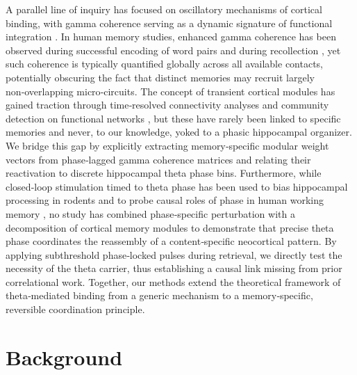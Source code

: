 \documentclass{article}
\begin{document}
A parallel line of inquiry has focused on oscillatory mechanisms of cortical binding, with gamma coherence serving as a dynamic signature of functional integration \cite{Singer1999Binding, Fries2005Gamma}. 
In human memory studies, enhanced gamma coherence has been observed during successful encoding of word pairs \cite{Sederberg2007Gamma} and during recollection \cite{Griffiths2019Directed}, yet such coherence is typically quantified globally across all available contacts, potentially obscuring the fact that distinct memories may recruit largely non‑overlapping micro‑circuits. 
The concept of transient cortical modules has gained traction through time‑resolved connectivity analyses \cite{Hsieh2017Dynamic} and community detection on functional networks \cite{Sporns2016Modular}, but these have rarely been linked to specific memories and never, to our knowledge, yoked to a phasic hippocampal organizer. 
We bridge this gap by explicitly extracting memory‑specific modular weight vectors from phase‑lagged gamma coherence matrices and relating their reactivation to discrete hippocampal theta phase bins. 
Furthermore, while closed‑loop stimulation timed to theta phase has been used to bias hippocampal processing in rodents \cite{Siegle2011Enhancement} and to probe causal roles of phase in human working memory \cite{Widge2015ClosedLoop}, no study has combined phase‑specific perturbation with a decomposition of cortical memory modules to demonstrate that precise theta phase coordinates the reassembly of a content‑specific neocortical pattern. 
By applying subthreshold phase‑locked pulses during retrieval, we directly test the necessity of the theta carrier, thus establishing a causal link missing from prior correlational work. 
Together, our methods extend the theoretical framework of theta‑mediated binding from a generic mechanism to a memory‑specific, reversible coordination principle.

\section{Background}
\end{document}
